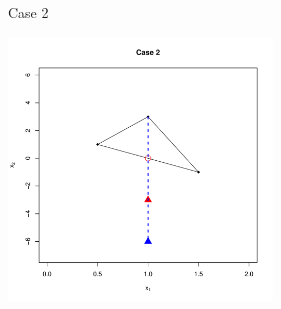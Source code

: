 \documentclass[10pt]{beamer}
\begin{document}
                                                                                              \begin{frame}{Case 2}
                                                                                                \begin{center}
                                                                                                  \includegraphics[height=7cm]{RCode/nmexpansion2.pdf}
                                                                                                \end{center}
                                                                                              \end{frame}
\end{document}
